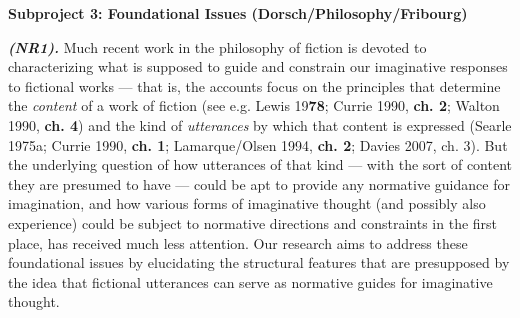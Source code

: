 

\vspace{.2cm}
\noindent\textbf{Subproject 3: Foundational Issues (Dorsch/Philosophy/Fribourg)}
\vspace{.2cm}


\vspace{.2cm}
\noindent \textbf{\emph{(NR1).}} Much recent work in the philosophy of fiction is devoted to characterizing what is supposed to guide and constrain our imaginative responses to fictional works --- that is, the accounts focus on the principles that determine the \emph{content} of a work of fiction (see e.g. Lewis 19\textbf{78}; Currie 1990, \textbf{ch. 2}; Walton 1990, \textbf{ch. 4}) and the kind of \emph{utterances} by which that content is expressed (Searle 1975a; Currie 1990, \textbf{ch. 1}; Lamarque/Olsen 1994, \textbf{ch. 2}; Davies 2007, ch. 3). But the underlying question of how utterances of that kind --- with the sort of content they are presumed to have --- could be apt to provide any normative guidance for imagination, and how various forms of imaginative thought (and possibly also experience) could be subject to normative directions and constraints in the first place, has received much less attention. Our research aims to address these foundational issues by elucidating the structural features that are presupposed by the idea that fictional utterances can serve as normative guides for imaginative thought.

